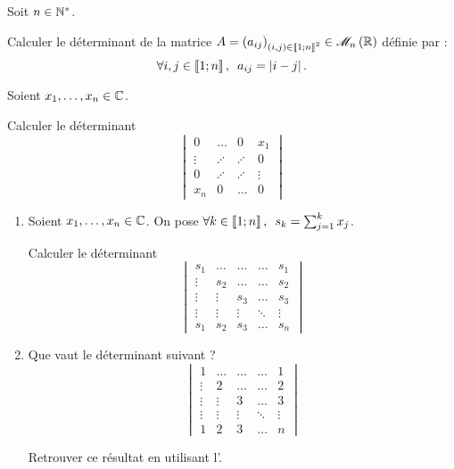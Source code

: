 \begin{exo}
Soit \(n\in\mathbb{N}^*\).

Calculer le déterminant de la matrice \(A=\paren{a_{ij}}_{\paren{i,j}\in\interventierii{1}{n}^2}\in\M{n}[\R]\) définie par : \[\quantifs{\forall i,j\in\interventierii{1}{n}}a_{ij}=\abs{i-j}.\]
\end{exo}

\begin{corr}
\end{corr}

\begin{exo}
Soient \(x_1,\dots,x_n\in\mathbb{C}\).

Calculer le déterminant \[\begin{vmatrix}
0 & \dots & 0 & x_1 \\
\vdots & \iddots & \iddots & 0 \\
0 & \iddots & \iddots & \vdots \\
x_n & 0 & \dots & 0
\end{vmatrix}\]
\end{exo}

\begin{corr}
\end{corr}

\begin{exo}
\begin{enumerate}
\item Soient \(x_1,\dots,x_n\in\mathbb{C}\). On pose \(\quantifs{\forall k\in\interventierii{1}{n}}s_k=\sum_{j=1}^kx_j\).

Calculer le déterminant \[\begin{vmatrix}
s_1 & \dots & \dots & \dots & s_1 \\
\vdots & s_2 & \dots & \dots & s_2 \\
\vdots & \vdots & s_3 & \dots & s_3 \\
\vdots & \vdots & \vdots & \ddots & \vdots \\
s_1 & s_2 & s_3 & \dots & s_n
\end{vmatrix}\]

\item Que vaut le déterminant suivant ? \[\begin{vmatrix}
1 & \dots & \dots & \dots & 1 \\
\vdots & 2 & \dots & \dots & 2 \\
\vdots & \vdots & 3 & \dots & 3 \\
\vdots & \vdots & \vdots & \ddots & \vdots \\
1 & 2 & 3 & \dots & n
\end{vmatrix}\]

Retrouver ce résultat en utilisant l'.
\end{enumerate}
\end{exo}

